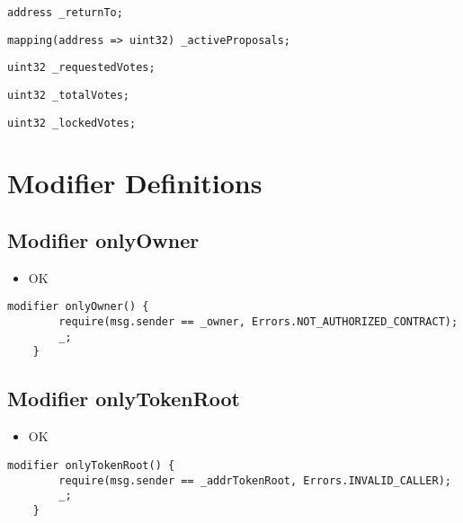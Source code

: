 \begin{lstlisting}[firstnumber=24]
    address _returnTo;
\end{lstlisting}

\begin{lstlisting}[firstnumber=26]
    mapping(address => uint32) _activeProposals;
\end{lstlisting}

\begin{lstlisting}[firstnumber=28]
    uint32 _requestedVotes;
\end{lstlisting}

\begin{lstlisting}[firstnumber=29]
    uint32 _totalVotes;
\end{lstlisting}

\begin{lstlisting}[firstnumber=30]
    uint32 _lockedVotes;
\end{lstlisting}

\section{Modifier Definitions}


\subsection{Modifier onlyOwner}

\begin{itemize}
\item OK
\end{itemize}

\begin{lstlisting}[firstnumber=34]
    modifier onlyOwner() {
        require(msg.sender == _owner, Errors.NOT_AUTHORIZED_CONTRACT);
        _;
    }
\end{lstlisting}

\subsection{Modifier onlyTokenRoot}

\begin{itemize}
\item OK
\end{itemize}

\begin{lstlisting}[firstnumber=39]
    modifier onlyTokenRoot() {
        require(msg.sender == _addrTokenRoot, Errors.INVALID_CALLER);
        _;
    }
\end{lstlisting}

